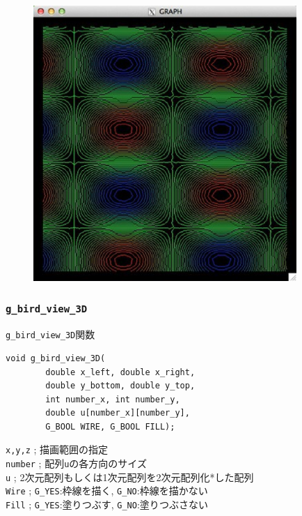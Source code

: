 \documentclass[platex,a4paper,12pt]{jsarticle}%
\begin{document}
\begin{figure}[htb]
\centering
	\includegraphics[width=100mm]{./Figures/eps/Canvas_g_contln.eps}
\end{figure}




\clearpage
\subsubsection{\texttt{g\_bird\_view\_3D}}

\begin{itembox}[l]{\texttt{g\_bird\_view\_3D}関数}
\begin{verbatim}
void g_bird_view_3D(
        double x_left, double x_right, 
        double y_bottom, double y_top,
        int number_x, int number_y,
        double u[number_x][number_y],
        G_BOOL WIRE, G_BOOL FILL);
\end{verbatim}
\verb|x,y,z| ; 描画範囲の指定\\
\verb|number| ; 配列\verb|u|の各方向のサイズ\\
\verb|u| ; 2次元配列もしくは1次元配列を2次元配列化*した配列\\
\verb|Wire| ; \verb|G_YES|:枠線を描く, \verb|G_NO|:枠線を描かない \\
\verb|Fill| ; \verb|G_YES|:塗りつぶす, \verb|G_NO|:塗りつぶさない 
\end{itembox}
\end{document}
